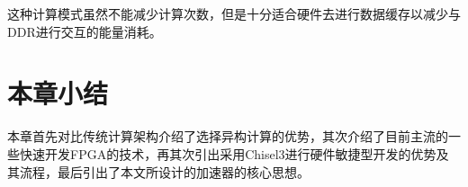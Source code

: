 这种计算模式虽然不能减少计算次数，但是十分适合硬件去进行数据缓存以减少与DDR进行交互的能量消耗。



\section{本章小结}
本章首先对比传统计算架构介绍了选择异构计算的优势，其次介绍了目前主流的一些快速开发FPGA的技术，再其次引出采用Chisel3进行硬件敏捷型开发的优势及其流程，最后引出了本文所设计的加速器的核心思想。






